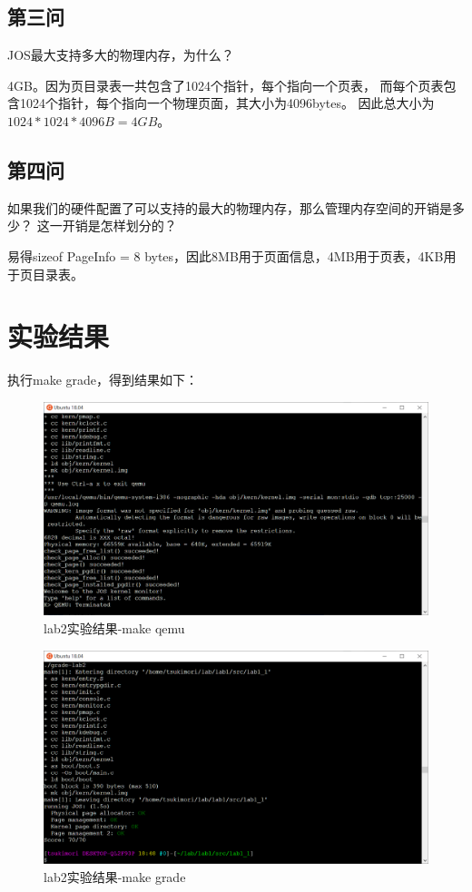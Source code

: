 \documentclass[12pt,a4paper,UTF8]{article}
\begin{document}
    \subsection{第三问}
    JOS最大支持多大的物理内存，为什么？

    4GB。因为页目录表一共包含了1024个指针，每个指向一个页表，
    而每个页表包含1024个指针，每个指向一个物理页面，其大小为4096bytes。
    因此总大小为$1024*1024*4096B=4GB$。
    
    \subsection{第四问}
    如果我们的硬件配置了可以支持的最大的物理内存，那么管理内存空间的开销是多少？
    这一开销是怎样划分的？

    易得sizeof PageInfo = 8 bytes，因此8MB用于页面信息，4MB用于页表，4KB用于页目录表。

\section{实验结果}

    执行make grade，得到结果如下：
    \begin{figure}[H]
        \centering
        \includegraphics[width = .85\linewidth]{img/2.png}
        \caption{lab2实验结果-make qemu}
        \label{fig::figure2}
    \end{figure}

    \begin{figure}[H]
        \centering
        \includegraphics[width = .85\linewidth]{img/3.png}
        \caption{lab2实验结果-make grade}
        \label{fig::figure3}
    \end{figure}
\end{document}
